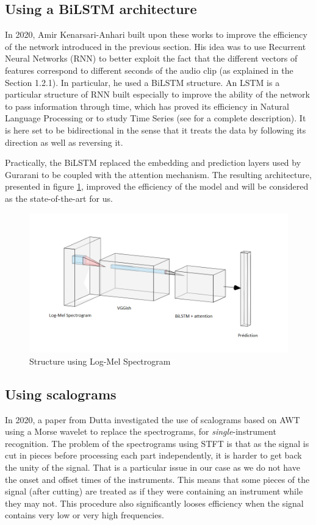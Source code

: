 \documentclass[final]{cvpr}
\begin{document}
\subsection{Using a BiLSTM architecture}
In 2020, Amir Kenarsari-Anhari \cite{squelette_progr} built upon these works to improve the efficiency of the network introduced in the previous section. His idea was to use Recurrent Neural Networks (RNN) to better exploit the fact that the different vectors of features correspond to different seconds of the audio clip (as explained in the Section 1.2.1). In particular, he used a BiLSTM structure. An LSTM is a particular structure of RNN built especially to improve the ability of the network to pass information through time, which has proved its efficiency in Natural Language Processing or to study Time Series (see \cite{lstm} for a complete description). It is here set to be bidirectional in the sense that it treats the data by following its direction as well as reversing it.

Practically, the BiLSTM replaced the embedding and prediction layers used by Gurarani \etal to be coupled with the attention mechanism. The resulting architecture, presented in figure \ref{mel}, improved the efficiency of the model and will be considered as the state-of-the-art for us. 
\begin{figure}
	\centering
	\includegraphics[scale = 0.45]{bilstm.png}
	\caption{Structure using Log-Mel Spectrogram}
	\label{mel}
\end{figure}
\subsection{Using scalograms}
In 2020, a paper from Dutta \etal \cite{features_descr} investigated the use of scalograms based on AWT using a Morse wavelet to replace the spectrograms, for \textit{single}-instrument recognition. The problem of the spectrograms using STFT is that as the signal is cut in pieces before processing each part independently, it is harder to get back the unity of the signal. That is a particular issue in our case as we do not have the onset and offset times of the instruments. This means that some pieces of the signal (after cutting) are treated as if they were containing an instrument while they may not. This procedure also significantly looses efficiency when the signal contains very low or very high frequencies. 
\end{document}
